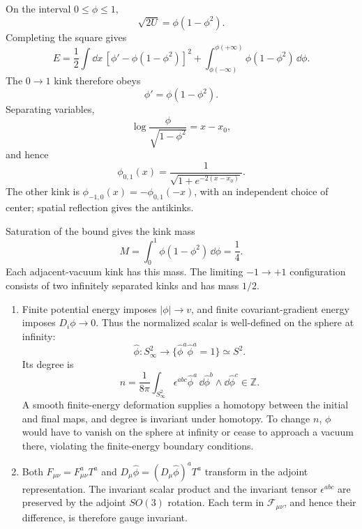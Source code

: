 \begin{enumerate}
  On the interval \(0\le\phi\le1\),
  \[
    \sqrt{2U}=\phi(1-\phi^2).
  \]
  Completing the square gives
  \[
    E=\frac12\int \dd x\,
      [\phi'-\phi(1-\phi^2)]^2
      +\int_{\phi(-\infty)}^{\phi(+\infty)}
        \phi(1-\phi^2)\,\dd\phi.
  \]
  The \(0\to1\) kink therefore obeys
  \[
    \boxed{\phi'=\phi(1-\phi^2).}
  \]
  Separating variables,
  \[
    \log\frac{\phi}{\sqrt{1-\phi^2}}=x-x_0,
  \]
  and hence
  \[
    \boxed{\phi_{0,1}(x)
      =\frac1{\sqrt{1+e^{-2(x-x_0)}}}.}
  \]
  The other kink is
  \(\phi_{-1,0}(x)=-\phi_{0,1}(-x)\), with an independent choice of
  center; spatial reflection gives the antikinks.

  Saturation of the bound gives the kink mass
  \[
    \boxed{M=\int_0^1\phi(1-\phi^2)\,\dd\phi=\frac14.}
  \]
  Each adjacent-vacuum kink has this mass.  The limiting
  \(-1\to+1\) configuration consists of two infinitely separated kinks
  and has mass \(1/2\).

  \begin{enumerate}
    \item[(a)]
    Finite potential energy imposes
    \(\lvert\phi\rvert\to v\), and finite covariant-gradient energy
    imposes \(D_i\phi\to0\).  Thus the normalized scalar is well-defined
    on the sphere at infinity:
    \[
      \widehat\phi:S^2_\infty\longrightarrow
        \{\widehat\phi^a\widehat\phi^a=1\}\simeq S^2.
    \]
    Its degree is
    \[
      n=\frac1{8\pi}\int_{S^2_\infty}
        \epsilon^{abc}\widehat\phi^a\,
        \dd\widehat\phi^b\wedge \dd\widehat\phi^c
        \in\mathbb Z.
    \]
    A smooth finite-energy deformation supplies a homotopy between the
    initial and final maps, and degree is invariant under homotopy.  To
    change \(n\), \(\phi\) would have to vanish on the sphere at infinity
    or cease to approach a vacuum there, violating the finite-energy
    boundary conditions.
    \item[(b)]
    Both \(F_{\mu\nu}=F_{\mu\nu}^aT^a\) and
    \(D_\mu\widehat\phi=(D_\mu\widehat\phi)^aT^a\) transform in the
    adjoint representation.  The invariant scalar product and the
    invariant tensor \(\epsilon^{abc}\) are preserved by the adjoint
    \(SO(3)\) rotation.  Each term in \(\mathcal F_{\mu\nu}\), and hence
    their difference, is therefore gauge invariant.


\end{enumerate}
\end{enumerate}
